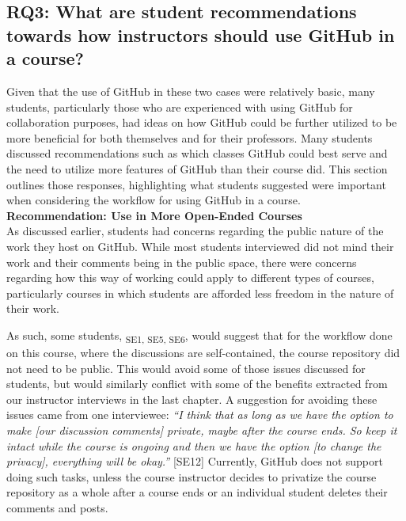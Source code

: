 \subsection{RQ3: What are student recommendations towards how instructors should use GitHub in a course?}

Given that the use of GitHub in these two cases were relatively basic, many students, particularly those who are experienced with using GitHub for collaboration purposes, had ideas on how GitHub could be further utilized to be more beneficial for both themselves and for their professors. Many students discussed recommendations such as which classes GitHub could best serve and the need to utilize more features of GitHub than their course did. This section outlines those responses, highlighting what students suggested were important when considering the workflow for using GitHub in a course. \\

\textbf{Recommendation: Use in More Open-Ended Courses} \\
As discussed earlier, students had concerns regarding the public nature of the work they host on GitHub. While most students interviewed did not mind their work and their comments being in the public space, there were concerns regarding how this way of working could apply to different types of courses, particularly courses in which students are afforded less freedom in the nature of their work. %

As such, some students, \textsubscript{SE1, SE5, SE6}, would suggest that for the workflow done on this course, where the discussions are self-contained, the course repository did not need to be public. This would avoid some of those issues discussed for students, but would similarly conflict with some of the benefits extracted from our instructor interviews in the last chapter. A suggestion for avoiding these issues came from one interviewee: \textit{``I think that as long as we have the option to make [our discussion comments] private, maybe after the course ends. So keep it intact while the course is ongoing and then we have the option [to change the privacy], everything will be okay.''} [SE12] Currently, GitHub does not support doing such tasks, unless the course instructor decides to privatize the course repository as a whole after a course ends or an individual student deletes their comments and posts. %

